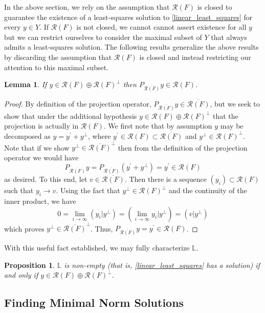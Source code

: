 \documentclass[12pt]{article}
\newcommand{\R}{\mathcal{R}}
\newtheorem{prop}{Proposition}
\newtheorem{lemma}{Lemma}
\begin{document}
In the above section, we rely on the assumption that $\R(F)$ is closed to guarantee the existence of a least-squares solution
to \eqref{linear_least_squares} for every $y \in Y$. 
If $\R(F)$ is not closed, we cannot cannot assert existence for all $y$  
but we can restrict ourselves to consider the maximal subset of $Y$ that always admits a least-squares solution. 
The following results generalize the above results by discarding the assumption that $\R(F)$ is closed and instead 
restricting our attention to this maximal subset. 

\begin{lemma} 
If $y \in \R(F) \oplus \R(F)^\perp$ then $P_{\overline{\R(F)}} y \in \R(F)$. 
\end{lemma} 

\begin{proof} 
By definition of the projection operator, $P_{\overline{\R(F)}} y \in \overline{\R(F)}$, but we seek to show that under the 
additional hypothesis $y \in \R(F) \oplus \R(F)^\perp$ that the projection is actually in $\R(F)$. We first note that 
by assumption $y$ may be decomposed as $y = y^\prime + y^\perp$, where $y^\prime \in \R(F) \subset \overline{\R(F)}$ and 
$y^\perp \in \R(F)^\perp$. Note that if we show $y^\perp \in \overline{\R(F)}^\perp$ then from the definition of the projection 
operator we would have \[P_{\overline{\R(F)}} y = P_{\overline{\R(F)}} (y^\prime + y^\perp) = y^\prime \in \R(F)\]
as desired. To this end, let $v \in \overline{\R(F)}$. Then there is a sequence $(y_i) \subset \R(F)$ such that $y_i \to v$. Using
the fact that $y^\perp \in \R(F)^\perp$ and the continuity of the inner product, we have 
\[0 = \lim_{i \to \infty} (y_i|y^\perp) = (\lim_{i \to \infty} y_i|y^\perp) = (v|y^\perp)\]
which proves $y^\perp \in \overline{\R(F)}^\perp$. Thus, $P_{\overline{\R(F)}} y = y^\prime \in \R(F)$.
\end{proof} 

With this useful fact established, we may fully characterize $\mathbb{L}$. 

\begin{prop} 
$\mathbb{L}$ is non-empty (that is, \eqref{linear_least_squares} has a solution) if and only if $y \in \R(F) \oplus \R(F)^\perp$. 
\end{prop} 

 \subsection{Finding Minimal Norm Solutions}
 
\end{document}
